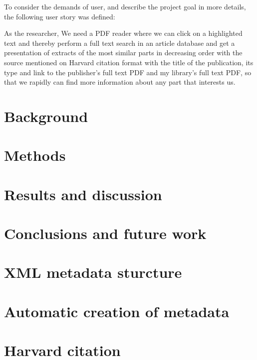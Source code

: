 \documentclass[a4paper,twocolumn,twoside]{article}
\begin{document}
	To consider the demands of user, and describe the project goal in more details, the following user story was defined:
	
	As the researcher, We need a PDF reader where we can click on a highlighted text and thereby perform a full text search in an article database and get a presentation of extracts of the most similar parts in decreasing order with the source mentioned on Harvard citation format with the title of the publication, its type and link to the publisher’s full text PDF and my library’s full text PDF, so that we rapidly can find more information about any part that interests us.
	
	
		
		
		
	\section{Background}
	\label{Background}
	

	

	\section{Methods}
	\label{Methods}
	
	
	
	
	
	\section{Results and discussion}
	\label{Results and discussion}

	\section{Conclusions and future work}
	\label{Conclusions and future work}
    
    
    

	\appendix
	\section{XML metadata sturcture}
	\label{XML}
	
	
	\section{Automatic creation of metadata}
	\label{metadata_creation}
	
	
	\section{Harvard citation}
	\label{Harvard}
	

		
	
		
	\clearpage 
\end{document}
